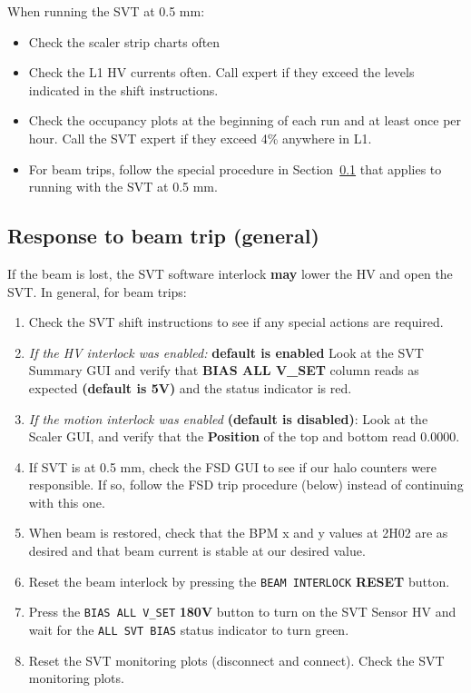 \documentclass[12pt]{report}
\begin{document}
When running the SVT at 0.5 mm:
\begin{itemize}
\item Check the scaler strip charts often
\item Check the L1 HV currents often.  Call expert if they exceed the levels indicated in the shift instructions.
\item Check the occupancy plots at the beginning of each run and at least once per hour.  Call the SVT expert if they exceed 4\% anywhere in L1.
\item For beam trips, follow the special procedure in Section~\ref{sec:proc_general_beamtrip} that applies to running with the SVT at 0.5 mm.
\end{itemize}

\subsection{Response to beam trip (general)}
\label{sec:proc_general_beamtrip}
If the beam is lost, the SVT software interlock \textbf{may} lower the HV and open the SVT.  In general, for beam trips:
\begin{enumerate}
\item Check the SVT shift instructions to see if any special actions are required.
\item \textit{If the HV interlock was enabled:} \textbf{default is enabled} Look at the SVT Summary GUI and verify that \textbf{BIAS ALL V\_SET} column reads as expected \textbf{(default is 5V)} and the status indicator is red.
\item \textit{If the motion interlock was enabled} \textbf{(default is disabled)}: Look at the Scaler GUI, and verify that the \textbf{Position} of the top and bottom read 0.0000.
\item If SVT is at 0.5 mm, check the FSD GUI to see if our halo counters were responsible. If so, follow the FSD trip procedure (below) instead of continuing with this one.
\item When beam is restored, check that the BPM x and y values at 2H02 are as desired and that beam current is stable at our desired value.
\item Reset the beam interlock by pressing the \texttt{BEAM INTERLOCK} \textbf{RESET} button.
\item Press the \texttt{BIAS ALL V\_SET} \textbf{180V} button to turn on the SVT Sensor HV and wait for the \texttt{ALL SVT BIAS} status indicator to turn green.
\item Reset the SVT monitoring plots (disconnect and connect). Check the SVT monitoring plots.
\end{enumerate}
\end{document}

